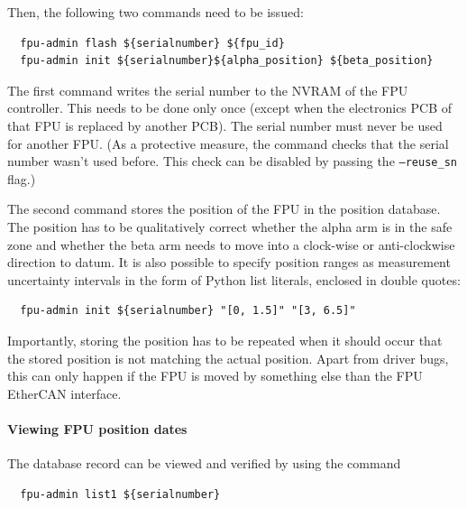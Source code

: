 \documentclass[fontsize=12,a4paper]{scrreprt}
\begin{document}
Then, the following two commands need to be issued:
%
%
%
%
%
%

\begin{verbatim}
  fpu-admin flash ${serialnumber} ${fpu_id}
  fpu-admin init ${serialnumber}${alpha_position} ${beta_position}
\end{verbatim}

The first command writes the serial number to the NVRAM of the FPU
controller. This needs to be done only once (except when the
electronics PCB of that FPU is replaced by another PCB). The serial
number must never be used for another FPU. (As a protective measure,
the command checks that the serial number wasn't used before. This
check can be disabled by passing the \texttt{--reuse\_sn} flag.)

The second command stores the position of the FPU in the position
database. The position has to be qualitatively correct whether the
alpha arm is in the safe zone and whether the beta arm needs to move
into a clock-wise or anti-clockwise direction to datum. It is also
possible to specify position ranges as measurement uncertainty
intervals in the form of Python list literals, enclosed in double
quotes:
\begin{verbatim}
  fpu-admin init ${serialnumber} "[0, 1.5]" "[3, 6.5]"
\end{verbatim}


Importantly, storing the position has to be repeated when it should
occur that the stored position is not matching the actual
position. Apart from driver bugs, this can only happen if the FPU is
moved by something else than the FPU EtherCAN interface.

\paragraph{Viewing FPU position dates}

The database record can be viewed and verified by using the command

\begin{verbatim}
  fpu-admin list1 ${serialnumber}
\end{verbatim}
\end{document}
